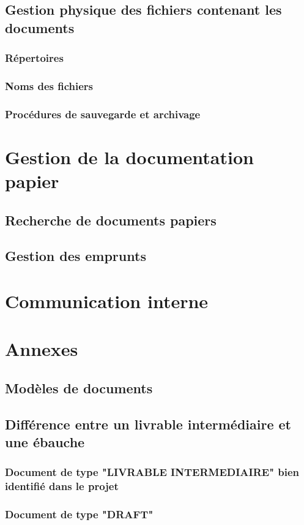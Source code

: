   \subsection{Gestion physique des fichiers contenant les documents}     
    \subsubsection{Répertoires}
    \subsubsection{Noms des fichiers}
    \subsubsection{Procédures de sauvegarde et archivage}
\section{Gestion de la documentation papier}
  \subsection{Recherche de documents papiers}
  \subsection{Gestion des emprunts}
\section{Communication interne}
\section{Annexes}
  \subsection{Modèles de documents}
  \subsection{Différence entre un livrable intermédiaire et une ébauche}     
    \subsubsection{Document de type "LIVRABLE INTERMEDIAIRE" bien identifié dans le projet}
    \subsubsection{Document de type "DRAFT"}
